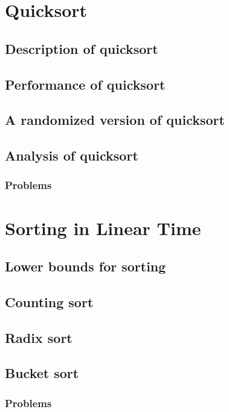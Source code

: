 \documentclass[fontsize=12pt,paper=a4]{book}
\begin{document}
\chapter{Quicksort}

\section{Description of quicksort}

\section{Performance of quicksort}

\section{A randomized version of quicksort}

\section{Analysis of quicksort}

\subsection*{Problems}


\chapter{Sorting in Linear Time}

\section{Lower bounds for sorting}

\section{Counting sort}

\section{Radix sort}

\section{Bucket sort}

\subsection*{Problems}
\end{document}
